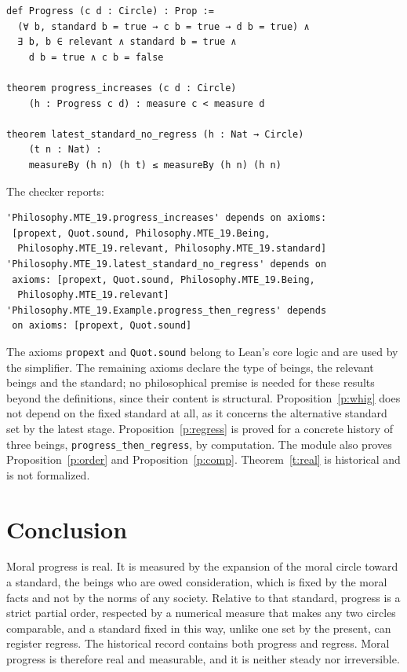 \documentclass{situationist-preprint}
\begin{document}
\begin{lstlisting}
def Progress (c d : Circle) : Prop :=
  (∀ b, standard b = true → c b = true → d b = true) ∧
  ∃ b, b ∈ relevant ∧ standard b = true ∧
    d b = true ∧ c b = false

theorem progress_increases (c d : Circle)
    (h : Progress c d) : measure c < measure d

theorem latest_standard_no_regress (h : Nat → Circle)
    (t n : Nat) :
    measureBy (h n) (h t) ≤ measureBy (h n) (h n)
\end{lstlisting}

The checker reports:

\begin{lstlisting}
'Philosophy.MTE_19.progress_increases' depends on axioms:
 [propext, Quot.sound, Philosophy.MTE_19.Being,
  Philosophy.MTE_19.relevant, Philosophy.MTE_19.standard]
'Philosophy.MTE_19.latest_standard_no_regress' depends on
 axioms: [propext, Quot.sound, Philosophy.MTE_19.Being,
  Philosophy.MTE_19.relevant]
'Philosophy.MTE_19.Example.progress_then_regress' depends
 on axioms: [propext, Quot.sound]
\end{lstlisting}

The axioms \texttt{propext} and \texttt{Quot.sound} belong to Lean's core logic and are used by the simplifier. The remaining axioms declare the type of beings, the relevant beings and the standard; no philosophical premise is needed for these results beyond the definitions, since their content is structural. Proposition~\ref{p:whig} does not depend on the fixed standard at all, as it concerns the alternative standard set by the latest stage. Proposition~\ref{p:regress} is proved for a concrete history of three beings, \texttt{progress\_then\_regress}, by computation. The module also proves Proposition~\ref{p:order} and Proposition~\ref{p:comp}. Theorem~\ref{t:real} is historical and is not formalized.

\section{Conclusion}

Moral progress is real. It is measured by the expansion of the moral circle toward a standard, the beings who are owed consideration, which is fixed by the moral facts and not by the norms of any society. Relative to that standard, progress is a strict partial order, respected by a numerical measure that makes any two circles comparable, and a standard fixed in this way, unlike one set by the present, can register regress. The historical record contains both progress and regress. Moral progress is therefore real and measurable, and it is neither steady nor irreversible.
\end{document}
